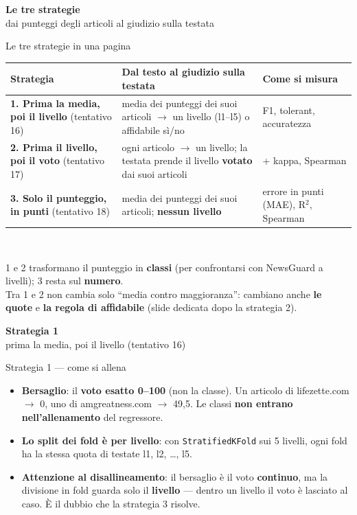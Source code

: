 \documentclass[aspectratio=169]{beamer}
\newcommand{\hl}[1]{\textbf{#1}}
\newcommand{\divider}[2]{%
  \begin{frame}[plain]
    \vfill
    \begin{center}
      {\color{dividerblue}\Huge\textbf{#1}}\\[0.8em]
      {\large #2}
    \end{center}
    \vfill
  \end{frame}}
\begin{document}
\divider{Le tre strategie}{dai punteggi degli articoli al giudizio sulla testata}

\begin{frame}{Le tre strategie in una pagina}
  \vfill
  \centering\small
  \begin{tabular}{>{\raggedright\arraybackslash}p{}>{\raggedright\arraybackslash}p{}>{\raggedright\arraybackslash}p{}}
    \toprule
    \textbf{Strategia} & \textbf{Dal testo al giudizio sulla testata} & \textbf{Come si misura} \\
    \midrule
    \hl{1. Prima la media, poi il livello} \newline (tentativo 16) & media dei punteggi dei suoi articoli $\to$ un livello
    (l1--l5) o affidabile s\`i/no & F1, tolerant, accuratezza \\
    \addlinespace
    \hl{2. Prima il livello, poi il voto} \newline (tentativo 17) & ogni articolo $\to$ un livello; la testata prende il livello
    \hl{votato} dai suoi articoli & + kappa, Spearman \\
    \addlinespace
    \hl{3. Solo il punteggio, in punti} \newline (tentativo 18) & media dei punteggi dei suoi articoli; \hl{nessun livello} & errore in punti
    (MAE), R$^2$, Spearman \\
    \bottomrule
  \end{tabular}\\[1em]
  \raggedright
  1 e 2 trasformano il punteggio in \hl{classi} (per confrontarsi con NewsGuard a livelli); 3 resta sul \hl{numero}.\\
  Tra 1 e 2 non cambia solo ``media contro maggioranza'': cambiano anche \hl{le quote} e \hl{la regola di affidabile}
  (slide dedicata dopo la strategia 2).
  \vfill
\end{frame}

\divider{Strategia 1}{prima la media, poi il livello (tentativo 16)}

\begin{frame}{Strategia 1 --- come si allena}
  \vfill
  \begin{itemize}
    \setlength\itemsep{0.9em}
    \item \hl{Bersaglio}: il \hl{voto esatto 0--100} (non la classe). Un articolo di lifezette.com $\to$ 0, uno di
          amgreatness.com $\to$ 49,5. Le classi \hl{non entrano nell'allenamento} del regressore.
    \item \hl{Lo split dei fold \`e per livello}: con \texttt{StratifiedKFold} sui 5 livelli, ogni fold ha la stessa quota di
          testate l1, l2, \ldots, l5.
    \item \hl{Attenzione al disallineamento}: il bersaglio \`e il voto \hl{continuo}, ma la divisione in fold guarda solo il
          \hl{livello} --- dentro un livello il voto \`e lasciato al caso. \`E il dubbio che la strategia 3 risolve.
  \end{itemize}
  \vfill
\end{frame}
\end{document}
